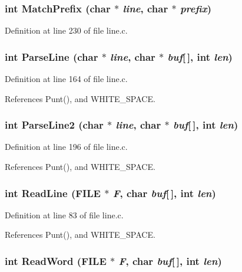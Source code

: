 \subsubsection{\setlength{\rightskip}{0pt plus 5cm}int Match\-Prefix (char $\ast$ {\em line}, char $\ast$ {\em prefix})}\label{line_8h_b7c2331b3542552b253c5b30d5f9131f}




Definition at line 230 of file line.c.
\subsubsection{\setlength{\rightskip}{0pt plus 5cm}int Parse\-Line (char $\ast$ {\em line}, char $\ast$ {\em buf}[$\,$], int {\em len})}\label{line_8h_d9ff5c7b4c5f922f6fe521ab9fb1d3e4}




Definition at line 164 of file line.c.

References Punt(), and WHITE\_\-SPACE.
\subsubsection{\setlength{\rightskip}{0pt plus 5cm}int Parse\-Line2 (char $\ast$ {\em line}, char $\ast$ {\em buf}[$\,$], int {\em len})}\label{line_8h_ff4d1d50c2aca693635d4e0236dfbf76}




Definition at line 196 of file line.c.

References Punt(), and WHITE\_\-SPACE.
\subsubsection{\setlength{\rightskip}{0pt plus 5cm}int Read\-Line (FILE $\ast$ {\em F}, char {\em buf}[$\,$], int {\em len})}\label{line_8h_31b3960aa0f504b47aacaa271c8ea85f}




Definition at line 83 of file line.c.

References Punt(), and WHITE\_\-SPACE.
\subsubsection{\setlength{\rightskip}{0pt plus 5cm}int Read\-Word (FILE $\ast$ {\em F}, char {\em buf}[$\,$], int {\em len})}\label{line_8h_9de51effd85ca271148cb40c7c271b14}




